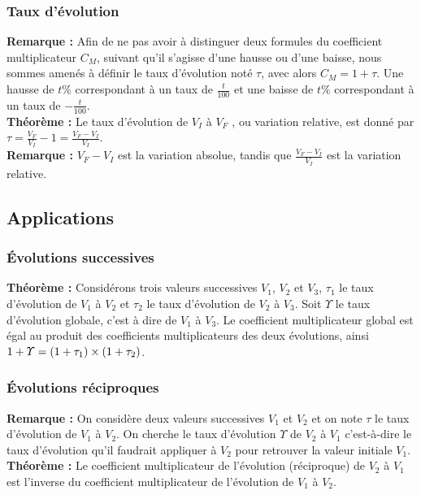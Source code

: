 \documentclass[a4paper,titlepage]{article}
\let\oldleft\left
\renewcommand{\left}{\mathopen{}\mathclose\bgroup\oldleft}
\let\oldright\right
\renewcommand{\right}{\aftergroup\egroup\oldright}
\begin{document}
        \subsubsection{Taux d’évolution}
            \textbf{Remarque :} Afin de ne pas avoir à distinguer deux formules du coefficient multiplicateur $C_{M}$, suivant qu’il s’agisse d’une hausse ou d’une baisse, nous sommes amenés à définir le taux d’évolution noté $\tau$, avec alors $C_{M}=1+\tau$. Une hausse de $t\%$ correspondant à un taux de $\frac{t}{100}$ et une baisse de $t\%$ correspondant à un taux de $-\frac{t}{100}$.
            \\
            \textbf{Théorème :} Le taux d’évolution de $V_{I}$ à $V_{F}$ , ou variation relative, est donné par $\tau=\frac{V_{F}}{V_{I}}-1=\frac{V_{F}-V_{I}}{V_{I}}$.
            \\
            \textbf{Remarque :} $V_{F}-V_{I}$ est la variation absolue, tandis que $\frac{V_{F}-V_{I}}{V_{I}}$ est la variation relative.
    \subsection{Applications}
        \subsubsection{Évolutions successives}
            \textbf{Théorème :} Considérons trois valeurs successives $V_{1}$, $V_{2}$ et $V_{3}$, $\tau_{1}$ le taux d’évolution de $V_{1}$ à $V_{2}$ et $\tau_{2}$ le taux d’évolution de $V_{2}$ à $V_{3}$. Soit $\varUpsilon$ le taux d’évolution globale, c’est à dire de $V_{1}$ à $V_{3}$. Le coefficient multiplicateur global est égal au produit des coefficients multiplicateurs des deux évolutions, ainsi\linebreak$1+\varUpsilon=\left(1+\tau_{1}\right)\times\left(1+\tau_{2}\right)$.
        \subsubsection{Évolutions réciproques}
            \textbf{Remarque :} On considère deux valeurs successives $V_{1}$ et $V_{2}$ et on note $\tau$ le taux d’évolution de $V_{1}$ à $V_{2}$. On cherche le taux d’évolution $\varUpsilon$ de $V_{2}$ à $V_{1}$ c’est-à-dire le taux d’évolution qu’il faudrait appliquer à $V_{2}$ pour retrouver la valeur initiale $V_{1}$.
            \\
            \textbf{Théorème :} Le coefficient multiplicateur de l’évolution (réciproque) de $V_{2}$ à $V_{1}$ est l’inverse du coefficient multiplicateur de l’évolution de $V_{1}$ à $V_{2}$.
\null\newpage
{}
\null\newpage
\null\newpage
\null\newpage
\end{document}
